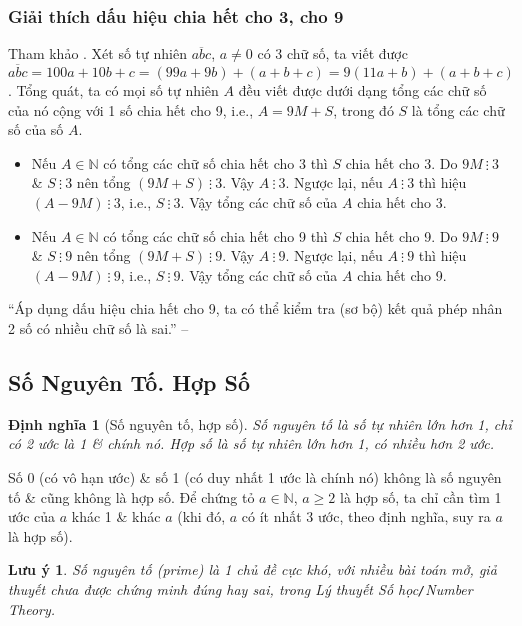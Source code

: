 \documentclass{article}
\numberwithin{equation}{section}
\newtheorem{definition}{Định nghĩa}[section]
\newtheorem{remark}{Lưu ý}[section]
\begin{document}
\subsubsection{Giải thích dấu hiệu chia hết cho 3, cho 9}
Tham khảo \cite[p. 40]{Thai_Anh_Dat_Ha_Loan_Nam_Quang_Toan_6_tap_1}. Xét số tự nhiên $\overline{abc}$, $a\ne 0$ có 3 chữ số, ta viết được $\overline{abc} = 100a + 10b + c = (99a + 9b) + (a + b + c) = 9(11a + b) + (a + b + c)$. Tổng quát, ta có mọi số tự nhiên $A$ đều viết được dưới dạng tổng các chữ số của nó cộng với 1 số chia hết cho 9, i.e., $A = 9M + S$, trong đó $S$ là tổng các chữ số của số $A$.
\begin{itemize}
	\item Nếu $A\in\mathbb{N}$ có tổng các chữ số chia hết cho 3 thì $S$ chia hết cho 3. Do $9M\ \vdots\ 3$ \& $S\ \vdots\ 3$ nên tổng $(9M + S)\ \vdots\ 3$. Vậy $A\ \vdots\ 3$. Ngược lại, nếu $A\ \vdots\ 3$ thì hiệu $(A - 9M)\ \vdots\ 3$, i.e., $S\ \vdots\ 3$. Vậy tổng các chữ số của $A$ chia hết cho 3.
	\item Nếu $A\in\mathbb{N}$ có tổng các chữ số chia hết cho 9 thì $S$ chia hết cho 9. Do $9M\ \vdots\ 9$ \& $S\ \vdots\ 9$ nên tổng $(9M + S)\ \vdots\ 9$. Vậy $A\ \vdots\ 9$. Ngược lại, nếu $A\ \vdots\ 9$  thì hiệu $(A - 9M)\ \vdots\ 9$, i.e., $S\ \vdots\ 9$. Vậy tổng các chữ số của $A$ chia hết cho 9.
\end{itemize}
``Áp dụng dấu hiệu chia hết cho 9, ta có thể kiểm tra (sơ bộ) kết quả phép nhân 2 số có nhiều chữ số là sai.'' -- \cite[p. 40]{Thai_Anh_Dat_Ha_Loan_Nam_Quang_Toan_6_tap_1}

\subsection{Số Nguyên Tố. Hợp Số}

\begin{definition}[Số nguyên tố, hợp số]
	\emph{Số nguyên tố} là số tự nhiên lớn hơn 1, chỉ có 2 ước là 1 \& chính nó. \emph{Hợp số} là số tự nhiên lớn hơn 1, có nhiều hơn 2 ước.
\end{definition}
Số 0 (có vô hạn ước) \& số 1 (có duy nhất 1 ước là chính nó) không là số nguyên tố \& cũng không là hợp số. Để chứng tỏ $a\in\mathbb{N}$, $a\ge 2$ là hợp số, ta chỉ cần tìm 1 ước của $a$ khác 1 \& khác $a$ (khi đó, $a$ có ít nhất 3 ước, theo định nghĩa, suy ra $a$ là hợp số).

\begin{remark}
	Số nguyên tố (prime) là 1 chủ đề cực khó, với nhiều bài toán mở, giả thuyết chưa được chứng minh đúng hay sai, trong Lý thuyết Số học\emph{\texttt{/}}Number Theory.
\end{remark}
\end{document}
